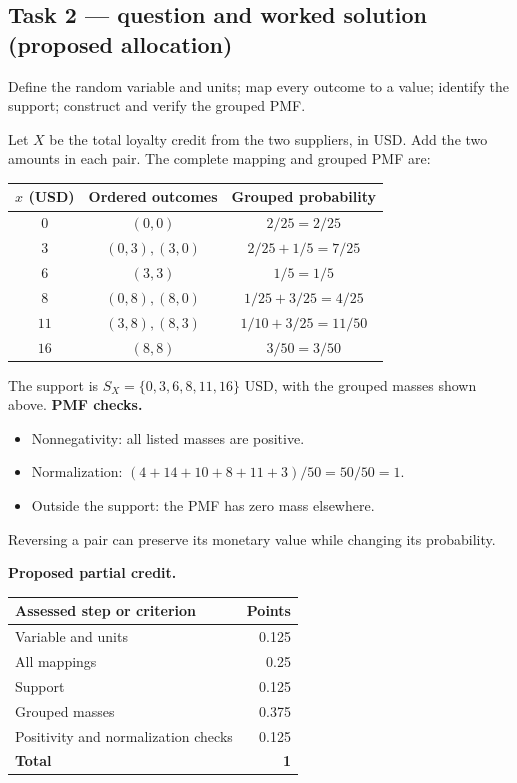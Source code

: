 \par\vspace{3mm}\secInicio[][sec:q2]

\subsection*{Task 2 --- question and worked solution (proposed allocation) }
\label{sol:q2t2}

Define the random variable and units; map every outcome to a value; identify the support; construct and verify the grouped PMF.

Let $X$ be the total loyalty credit from the two suppliers, in USD. Add the two amounts in each pair. The complete mapping and grouped PMF are:

\begin{center}
\begin{tabular}{ccc}\toprule
$x$ (USD) & Ordered outcomes & Grouped probability\\\midrule
$0$ & $(0,0)$ & $2/25=2/25$\\
$3$ & $(0,3),(3,0)$ & $2/25+1/5=7/25$\\
$6$ & $(3,3)$ & $1/5=1/5$\\
$8$ & $(0,8),(8,0)$ & $1/25+3/25=4/25$\\
$11$ & $(3,8),(8,3)$ & $1/10+3/25=11/50$\\
$16$ & $(8,8)$ & $3/50=3/50$\\
\bottomrule\end{tabular}
\end{center}

The support is $S_X=\{0,3,6,8,11,16\}$ USD, with the grouped masses shown above.
\textbf{PMF checks.}
\begin{itemize}
\item Nonnegativity: all listed masses are positive.
\item Normalization: $(4+14+10+8+11+3)/50=50/50=1$.
\item Outside the support: the PMF has zero mass elsewhere.
\end{itemize}

Reversing a pair can preserve its monetary value while changing its probability.

\par\smallskip
\noindent\begin{minipage}{\linewidth}
\textbf{Proposed partial credit.}\par\smallskip
\begin{tabularx}{\linewidth}{@{}>{\raggedright\arraybackslash}X r@{}}\toprule
\textbf{Assessed step or criterion} & \textbf{Points}\\\midrule
Variable and units & 0.125\\
All mappings & 0.25\\
Support & 0.125\\
Grouped masses & 0.375\\
Positivity and normalization checks & 0.125\\
\midrule
\textbf{Total} & \textbf{1}\\
\bottomrule\end{tabularx}
\end{minipage}\par\smallskip


